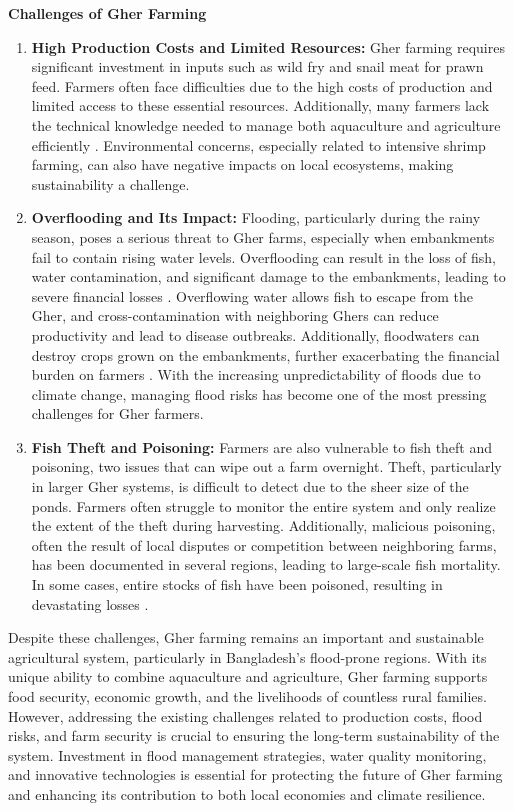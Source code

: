 \documentclass[conference]{IEEEtran}
\begin{document}
\textbf{Challenges of Gher Farming}
\begin{enumerate}
    \item \textbf{High Production Costs and Limited Resources:} 
    Gher farming requires significant investment in inputs such as wild fry and snail meat for prawn feed. Farmers often face difficulties due to the high costs of production and limited access to these essential resources. Additionally, many farmers lack the technical knowledge needed to manage both aquaculture and agriculture efficiently \cite{ref1}. Environmental concerns, especially related to intensive shrimp farming, can also have negative impacts on local ecosystems, making sustainability a challenge.

    \item \textbf{Overflooding and Its Impact:} 
Flooding, particularly during the rainy season, poses a serious threat to Gher farms, especially when embankments fail to contain rising water levels. Overflooding can result in the loss of fish, water contamination, and significant damage to the embankments, leading to severe financial losses \cite{ref5}. Overflowing water allows fish to escape from the Gher, and cross-contamination with neighboring Ghers can reduce productivity and lead to disease outbreaks. Additionally, floodwaters can destroy crops grown on the embankments, further exacerbating the financial burden on farmers \cite{ref4}. With the increasing unpredictability of floods due to climate change, managing flood risks has become one of the most pressing challenges for Gher farmers.

    \item \textbf{Fish Theft and Poisoning:} 
Farmers are also vulnerable to fish theft and poisoning, two issues that can wipe out a farm overnight. Theft, particularly in larger Gher systems, is difficult to detect due to the sheer size of the ponds. Farmers often struggle to monitor the entire system and only realize the extent of the theft during harvesting. Additionally, malicious poisoning, often the result of local disputes or competition between neighboring farms, has been documented in several regions, leading to large-scale fish mortality. In some cases, entire stocks of fish have been poisoned, resulting in devastating losses \cite{ref1}.
        
\end{enumerate}

Despite these challenges, Gher farming remains an important and sustainable agricultural system, particularly in Bangladesh's flood-prone regions. With its unique ability to combine aquaculture and agriculture, Gher farming supports food security, economic growth, and the livelihoods of countless rural families. However, addressing the existing challenges related to production costs, flood risks, and farm security is crucial to ensuring the long-term sustainability of the system. Investment in flood management strategies, water quality monitoring, and innovative technologies is essential for protecting the future of Gher farming and enhancing its contribution to both local economies and climate resilience.
\end{document}
